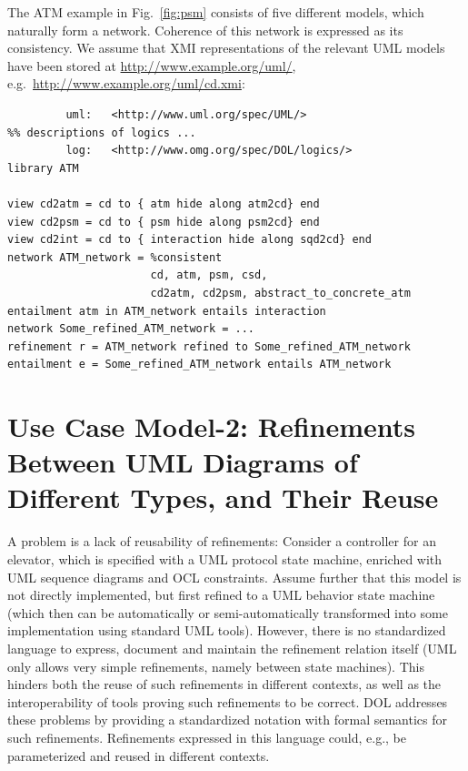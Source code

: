 \documentclass[10pt,fleqn,%
\ifpretendfinal
final%
\else
draft%
\fi,
]{scrreprt}
\begin{document}
The ATM example in Fig.~\ref{fig:psm} consists of five different
models, which naturally form a network. Coherence of this network
is expressed as its consistency.
We assume that XMI representations of the
relevant UML models have been stored at
\url{http://www.example.org/uml/},
e.g.\ \url{http://www.example.org/uml/cd.xmi}:
\begin{lstlisting}[basicstyle=\ttfamily,language=dolText,morekeywords={props,ObjectProperty,Class,DisjointUnionOf,SubClassOf,Characteristics,Transitive,Asymmetric,SubPropertyOf,DisjointClasses,EquivalentTo,inverse,only,forall,iff,if,or,exists,distributed,refinement,library,via,network,entailment,entails,refined,consistent},escapechar=@,mathescape]
%prefix( :     <http://www.example.org/uml/>
         uml:   <http://www.uml.org/spec/UML/>
%% descriptions of logics ...		 
         log:   <http://www.omg.org/spec/DOL/logics/>
library ATM

view cd2atm = cd to { atm hide along atm2cd} end
view cd2psm = cd to { psm hide along psm2cd} end
view cd2int = cd to { interaction hide along sqd2cd} end
network ATM_network = %consistent
                      cd, atm, psm, csd,
                      cd2atm, cd2psm, abstract_to_concrete_atm
entailment atm in ATM_network entails interaction
network Some_refined_ATM_network = ...
refinement r = ATM_network refined to Some_refined_ATM_network
entailment e = Some_refined_ATM_network entails ATM_network
\end{lstlisting}

\section{Use Case Model-2: Refinements Between UML Diagrams of Different Types, and Their Reuse}
\label{model-2}

A problem is a lack of reusability of refinements: Consider a controller for an elevator, which is specified with a UML protocol state machine, enriched with UML 
sequence diagrams and OCL constraints. Assume further that this model is not directly implemented, but first refined to a UML behavior state machine (which then 
can be automatically or semi-automatically transformed into some implementation using standard UML tools). However, there is no standardized language to 
express, document and maintain the refinement relation itself (UML only allows very simple refinements, namely between state machines). This hinders both the 
reuse of such refinements in different contexts, as well as the interoperability of tools proving such refinements to be correct. DOL  
addresses these problems by providing a standardized notation with formal semantics for such refinements. Refinements expressed in this language could, e.g., be 
parameterized and reused in different contexts.
\end{document}
